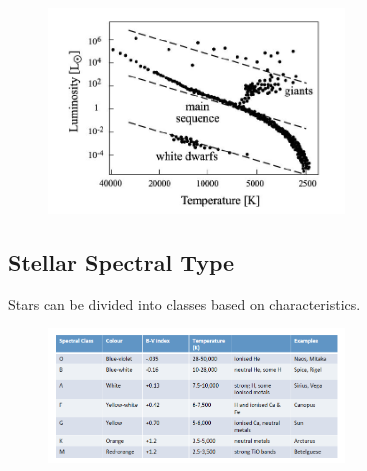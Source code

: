 \documentclass[a4paper]{article} %
\begin{document}
\begin{figure}[h]
\centering
\includegraphics[width=0.7\textwidth]{images/hr-diagram.png}
\end{figure}

\subsection{Stellar Spectral Type}
Stars can be divided into classes based on characteristics.

\begin{figure}[h]
\centering
\includegraphics[width=0.7\textwidth]{images/spectral-types.png}
\end{figure}



\pagebreak

\end{document}
